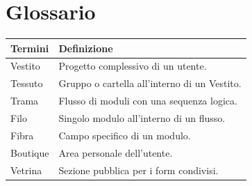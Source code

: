 \documentclass[11pt]{article}
\begin{document}





\section{Glossario}
\begin{tabularx}{\linewidth}{lX}
    \toprule
    \textbf{Termini} & \textbf{Definizione} \\
    \midrule
    Vestito & Progetto complessivo di un utente. \\
    Tessuto & Gruppo o cartella all'interno di un Vestito. \\
    Trama & Flusso di moduli con una sequenza logica. \\
    Filo & Singolo modulo all'interno di un flusso. \\
    Fibra & Campo specifico di un modulo. \\
    Boutique & Area personale dell'utente. \\
    Vetrina & Sezione pubblica per i form condivisi. \\
    \bottomrule
\end{tabularx}
\end{document}
